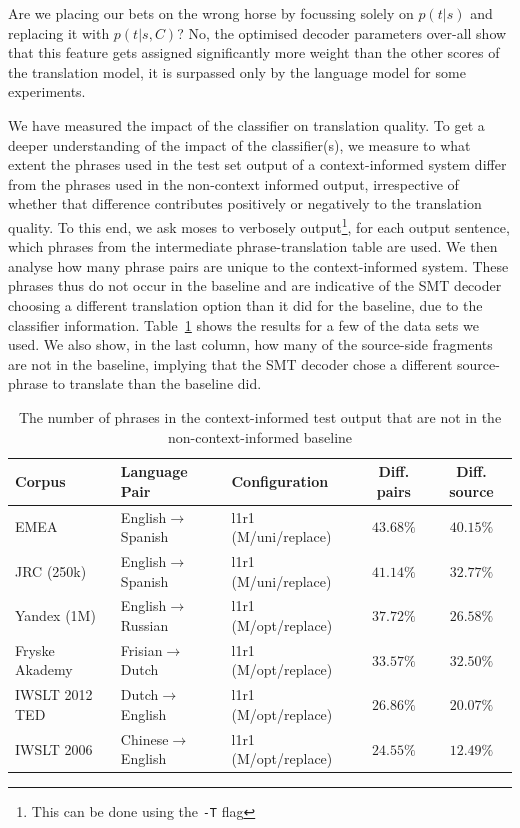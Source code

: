 \documentclass[smallextended]{svjour3}       %
\theoremstyle{break}
\begin{document}
Are we placing our bets on the wrong horse by focussing solely on $p(t|s)$ and
replacing it with $p(t|s,C)$? No, the optimised decoder parameters over-all
show that this feature gets assigned significantly more weight than the other
scores of the translation model, it is surpassed only by the language model for
some experiments.

We have measured the impact of the classifier on translation quality. To get a
deeper understanding of the impact of the classifier(s), we measure to what
extent the phrases used in the test set output of a context-informed system
differ from the phrases used in the non-context informed output, irrespective
of whether that difference contributes positively or negatively to the
translation quality. To this end, we ask moses to verbosely
output\footnote{This can be done using the \texttt{-T} flag}, for each output
sentence, which phrases from the intermediate phrase-translation table are
used. We then analyse how many phrase pairs are unique to the context-informed
system. These phrases thus do not occur in the baseline and are indicative of
the SMT decoder choosing a different translation option than it did for the
baseline, due to the classifier information. Table~\ref{tab:decodediff} shows
the results for a few of the data sets we used. We also show, in the last
column, how many of the source-side fragments are not in the baseline, implying
that the SMT decoder chose a different source-phrase to translate than the
baseline did.

\begin{table}
\begin{center}
\begin{tabular}{|lll|cc|}
\hline
\textbf{Corpus} & \textbf{Language Pair} & \textbf{Configuration} &
\textbf{Diff. pairs} & \textbf{Diff. source} \\
\hline
EMEA & English$\rightarrow$Spanish & l1r1 (M/uni/replace) & $43.68\%$ & $40.15\%$ \\
JRC (250k) & English$\rightarrow$Spanish & l1r1 (M/uni/replace) & $41.14\%$ & $32.77\%$ \\
Yandex (1M) & English$\rightarrow$Russian & l1r1 (M/opt/replace) & $37.72\%$ & $26.58\%$ \\
Fryske Akademy & Frisian$\rightarrow$Dutch & l1r1 (M/opt/replace) & $33.57\%$ & $32.50\%$ \\
IWSLT 2012 TED & Dutch$\rightarrow$English & l1r1 (M/opt/replace) & $26.86\%$ & $20.07\%$ \\
IWSLT 2006 & Chinese$\rightarrow$English & l1r1 (M/opt/replace) & $24.55\%$ & $12.49\%$ \\
\hline
\end{tabular}
\caption{The number of phrases in the context-informed test output that are not
in the non-context-informed baseline}
\label{tab:decodediff}
\end{center}
\end{table}
\end{document}
